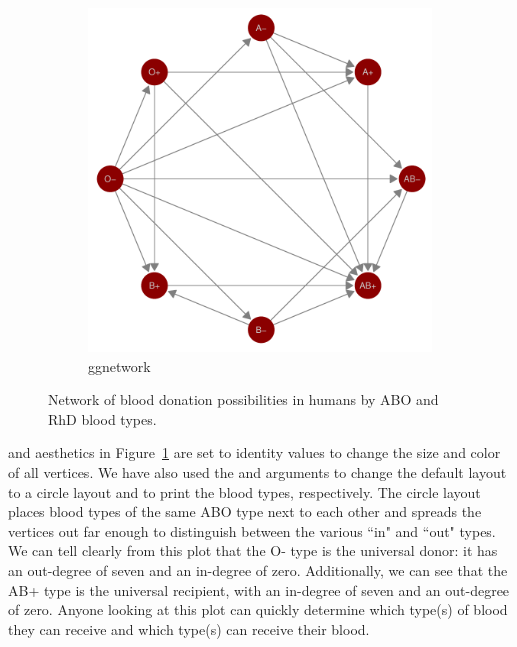 \begin{figure}[hbt]
\begin{subfigure}[t]{.32\textwidth}
\end{subfigure}
\begin{subfigure}[t]{.32\textwidth}
\caption{ggnetwork}
\includegraphics[width=\textwidth]{figure/blood_ggnetwork-1.pdf}
\end{subfigure}
\caption{\label{fig.cap:blood} Network of blood donation possibilities in humans by ABO and RhD blood types.}
\end{figure}

 and  aesthetics in Figure~\ref{fig.cap:blood} are set to identity values to change the size and color of all vertices. We have also used the  and  arguments to change the default layout to a circle layout and to print the blood types, respectively. The circle layout places blood types of the same ABO type next to each other and spreads the vertices out far enough to distinguish between the various ``in" and ``out" types.  We can tell clearly from this plot that the O- type is the universal donor: it has an out-degree of seven and an in-degree of zero. Additionally, we can see that the AB+ type is the universal recipient, with an in-degree of seven and an out-degree of zero. Anyone looking at this plot can quickly determine which type(s) of blood they can receive and which type(s) can receive their blood.


